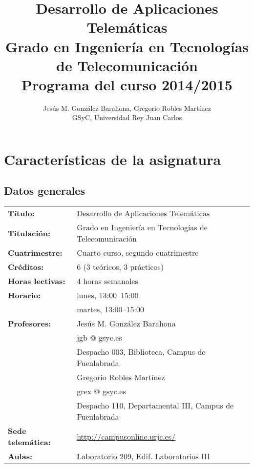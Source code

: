 \documentclass[a4paper,12pt]{report}
\title{Desarrollo de Aplicaciones Telemáticas \\
Grado en Ingeniería en Tecnologías de Telecomunicación \\
Programa del curso 2014/2015}
\author{Jesús M. González Barahona, Gregorio Robles Martínez \\
GSyC, Universidad Rey Juan Carlos}
\begin{document}
\maketitle

\tableofcontents

\newpage

\chapter{Características de la asignatura}

\section{Datos generales}

\begin{tabular}{ll}
\textbf{Título:} & Desarrollo de Aplicaciones Telemáticas  \\
\textbf{Titulación:} & Grado en Ingeniería en Tecnologías de Telecomunicación \\
\textbf{Cuatrimestre:} & Cuarto curso, segundo cuatrimestre \\
\textbf{Créditos:} & 6 (3 teóricos, 3 prácticos) \\
\textbf{Horas lectivas:} & 4 horas semanales \\
\textbf{Horario:} & lunes, 13:00--15:00 \\
                  & martes, 13:00--15:00 \\
\textbf{Profesores:}
& Jesús M. González Barahona \\
& \hspace{1cm}jgb @ gsyc.es \\
& \hspace{1cm}Despacho 003, Biblioteca, Campus de Fuenlabrada\\
& Gregorio Robles Martínez\\
& \hspace{1cm}grex @ gsyc.es \\
& \hspace{1cm}Despacho 110, Departamental III, Campus de Fuenlabrada\\
\textbf{Sede telemática:} & \url{http://campusonline.urjc.es/} \\
\textbf{Aulas:} & Laboratorio 209, Edif. Laboratorios III \\
\end{tabular}
\end{document}

